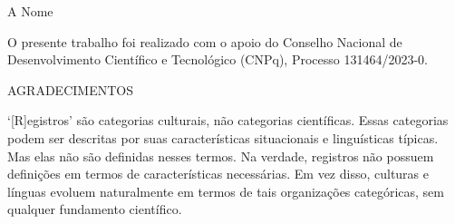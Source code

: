 \begin{titlepage}
    \begin{center}
        \vspace*{11cm}
        {A Nome}
        \vfill
    \end{center}
\end{titlepage}

\begin{titlepage}
    \vspace*{10cm}
    \begin{adjustwidth}{0.5\textwidth}{0cm}
        O presente trabalho foi realizado com o apoio do Conselho Nacional de Desenvolvimento Científico e Tecnológico (CNPq), Processo 131464/2023-0.
    \end{adjustwidth}
\end{titlepage}

\begin{titlepage}
    \begin{center}
        {\large \MakeUppercase{Agradecimentos}}
    \end{center}
    \vspace{1cm}

    \lipsum[1-2]

\end{titlepage}

\begin{titlepage}
    \vspace*{\fill}
    \epigraph{`[R]egistros' são categorias culturais, não categorias científicas. Essas categorias podem ser descritas por suas características situacionais e linguísticas típicas. Mas elas não são definidas nesses termos. Na verdade, registros não possuem definições em termos de características necessárias. Em vez disso, culturas e línguas evoluem naturalmente em termos de tais organizações categóricas, sem qualquer fundamento científico.}{}
\end{titlepage}

